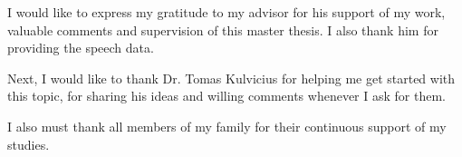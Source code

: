 
\begin{acknowledgements}
\vspace{1cm}
I would like to express my gratitude to my advisor \mbox{\supname} for his support of my work, valuable comments and supervision of this master thesis. I also thank him for providing the speech data.

Next, I would like to thank Dr. Tomas Kulvicius for helping me get started with this topic, for sharing his ideas and willing comments whenever I ask for them.

I also must thank all members of my family for their continuous support of my studies.

\end{acknowledgements}